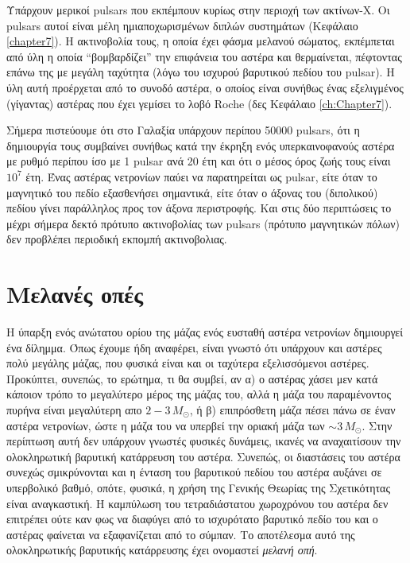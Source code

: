 Υπάρχουν μερικοί pulsars που εκπέμπουν κυρίως στην περιοχή των ακτίνων-X. Οι pulsars αυτοί είναι μέλη ημιαποχωρισμένων διπλών συστημάτων (Κεφάλαιο \ref{chapter7}). Η ακτινοβολία τους, η οποία έχει φάσμα μελανού σώματος, εκπέμπεται από ύλη η οποία ``βομβαρδίζει'' την επιφάνεια του αστέρα και θερμαίνεται, πέφτοντας επάνω της με μεγάλη ταχύτητα (λόγω του ισχυρού βαρυτικού πεδίου του pulsar). Η ύλη αυτή προέρχεται από το συνοδό αστέρα, ο οποίος είναι συνήθως ένας εξελιγμένος (γίγαντας) αστέρας που έχει γεμίσει το λοβό Roche (δες Κεφάλαιο \ref{ch:Chapter7}).

Σήμερα πιστεύουμε ότι στο Γαλαξία υπάρχουν περίπου 50000 pulsars, ότι η δημιουργία τους συμβαίνει συνήθως κατά την έκρηξη ενός υπερκαινοφανούς αστέρα με ρυθμό περίπου ίσο με 1 pulsar ανά 20 έτη και ότι ο μέσος όρος ζωής τους είναι $10^7$ έτη. Ένας αστέρας νετρονίων παύει να παρατηρείται ως pulsar, είτε όταν το μαγνητικό του πεδίο εξασθενήσει σημαντικά, είτε όταν ο άξονας του (διπολικού) πεδίου γίνει παράλληλος προς τον άξονα περιστροφής. Και στις δύο περιπτώσεις το μέχρι σήμερα δεκτό πρότυπο ακτινοβολίας των pulsars (πρότυπο μαγνητικών πόλων) δεν προβλέπει περιοδική εκπομπή ακτινοβολιας.









\section{Μελανές οπές}
Η ύπαρξη ενός ανώτατου ορίου της μάζας ενός ευσταθή αστέρα νετρονίων δημιουργεί ένα δίλημμα. Όπως έχουμε ήδη αναφέρει, είναι γνωστό ότι υπάρχουν και αστέρες πολύ μεγάλης μάζας, που φυσικά είναι και οι ταχύτερα εξελισσόμενοι αστέρες. Προκύπτει, συνεπώς, το ερώτημα, τι θα συμβεί, αν α) ο αστέρας χάσει μεν κατά κάποιον τρόπο το μεγαλύτερο μέρος της μάζας του, αλλά η μάζα του παραμένοντος πυρήνα είναι μεγαλύτερη απο $2 - 3\,M_\odot$,  ή β) επιπρόσθετη μάζα πέσει πάνω σε έναν αστέρα νετρονίων, ώστε η μάζα του να υπερβεί την οριακή μάζα των $\sim 3\,M_\odot$. Στην περίπτωση αυτή δεν υπάρχουν γνωστές φυσικές δυνάμεις, ικανές να αναχαιτίσουν την ολοκληρωτική βαρυτική κατάρρευση του αστέρα. Συνεπώς, οι διαστάσεις του αστέρα συνεχώς σμικρύνονται και η ένταση του βαρυτικού πεδίου του αστέρα αυξάνει σε υπερβολικό βαθμό, οπότε, φυσικά, η χρήση της Γενικής Θεωρίας της Σχετικότητας είναι αναγκαστική. Η καμπύλωση του τετραδιάστατου χωροχρόνου του αστέρα δεν επιτρέπει ούτε καν φως να διαφύγει από το ισχυρότατο βαρυτικό πεδίο του και ο αστέρας φαίνεται να εξαφανίζεται από το σύμπαν. Το αποτέλεσμα αυτό της ολοκληρωτικής βαρυτικής κατάρρευσης έχει ονομαστεί \textit{μελανή οπή}.

